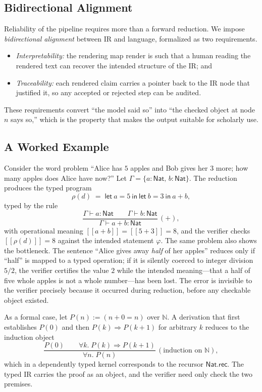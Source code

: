 \documentclass[11pt]{article}
\newcommand{\den}[1]{[\![#1]\!]}
\newcommand{\Nat}{\mathbb{N}}
\theoremstyle{definition}
\theoremstyle{plain}
\theoremstyle{remark}
\begin{document}
\subsection{Bidirectional Alignment}
Reliability of the pipeline requires more than a forward reduction. We impose
\emph{bidirectional alignment} between IR and language, formalized as two requirements.
\begin{itemize}[leftmargin=1.5em]
  \item \emph{Interpretability:} the rendering map $\mathrm{render}$ is such that a human
        reading the rendered text can recover the intended structure of the IR; and
  \item \emph{Traceability:} each rendered claim carries a pointer back to the IR node that
        justified it, so any accepted or rejected step can be audited.
\end{itemize}
These requirements convert ``the model said so'' into ``the checked object at node $n$ says
so,'' which is the property that makes the output suitable for scholarly use.

\subsection{A Worked Example}\label{sec:example}
Consider the word problem ``Alice has $5$ apples and Bob gives her $3$ more; how many apples
does Alice have now?'' Let $\Gamma = \{a : \mathsf{Nat},\, b : \mathsf{Nat}\}$. The reduction
produces the typed program
\[
\rho(d) \;=\; \mathsf{let}\ a=5\ \mathsf{in}\ \mathsf{let}\ b=3\ \mathsf{in}\ a + b,
\]
typed by the rule
\[
\frac{\Gamma \vdash a : \mathsf{Nat} \qquad \Gamma \vdash b : \mathsf{Nat}}
      {\Gamma \vdash a + b : \mathsf{Nat}}\,(\mathsf{+}),
\]
with operational meaning $\den{a+b} = \den{5+3} = 8$, and the verifier checks
$\den{\rho(d)} = 8$ against the intended statement $\varphi$. The same problem also shows the
bottleneck. The sentence ``Alice gives away \emph{half} of her apples'' reduces only if
``half'' is mapped to a typed operation; if it is silently coerced to integer division
$5 / 2$, the verifier certifies the value $2$ while the intended meaning---that a half of five
whole apples is not a whole number---has been lost. The error is invisible to the verifier
precisely because it occurred during reduction, before any checkable object existed.

As a formal case, let $P(n) := (n + 0 = n)$ over $\Nat$. A derivation that first establishes
$P(0)$ and then $P(k) \Rightarrow P(k+1)$ for arbitrary $k$ reduces to the induction object
\[
\frac{P(0) \qquad \forall k.\; P(k) \Rightarrow P(k+1)}
      {\forall n.\; P(n)}\,(\text{induction on }\Nat),
\]
which in a dependently typed kernel corresponds to the recursor $\mathsf{Nat.rec}$. The typed
IR carries the proof as an object, and the verifier need only check the two premises.
\end{document}
